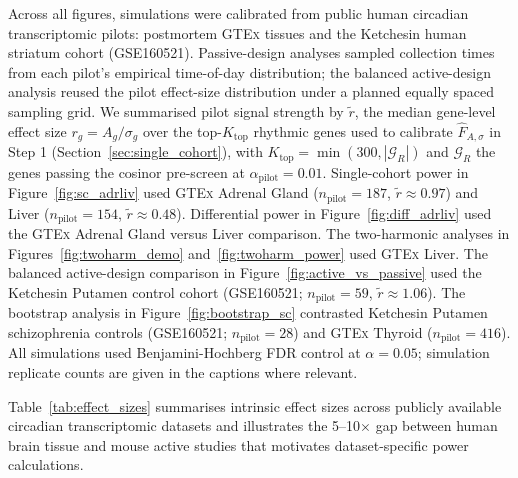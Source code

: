 \documentclass{article}
\begin{document}
Across all figures, simulations were calibrated from public human circadian transcriptomic pilots: postmortem \textsc{GTEx} \citep{gtex2020atlas} tissues and the Ketchesin human striatum cohort \citep{ketchesin2021diurnal} (GSE160521). Passive-design analyses sampled collection times from each pilot's empirical time-of-day distribution; the balanced active-design analysis reused the pilot effect-size distribution under a planned equally spaced sampling grid. We summarised pilot signal strength by $\tilde{r}$, the median gene-level effect size $r_g = A_g/\sigma_g$ over the top-$K_{\mathrm{top}}$ rhythmic genes used to calibrate $\hat{F}_{A,\sigma}$ in Step 1 (Section~\ref{sec:single_cohort}), with $K_{\mathrm{top}} = \min(300, |\mathcal{G}_R|)$ and $\mathcal{G}_R$ the genes passing the cosinor pre-screen at $\alpha_{\mathrm{pilot}} = 0.01$. Single-cohort power in Figure~\ref{fig:sc_adrliv} used \textsc{GTEx} Adrenal Gland ($n_{\text{pilot}} = 187$, $\tilde{r} \approx 0.97$) and Liver ($n_{\text{pilot}} = 154$, $\tilde{r} \approx 0.48$). Differential power in Figure~\ref{fig:diff_adrliv} used the \textsc{GTEx} Adrenal Gland versus Liver comparison. The two-harmonic analyses in Figures~\ref{fig:twoharm_demo} and~\ref{fig:twoharm_power} used \textsc{GTEx} Liver. The balanced active-design comparison in Figure~\ref{fig:active_vs_passive} used the Ketchesin Putamen control cohort (GSE160521; $n_{\text{pilot}} = 59$, $\tilde{r} \approx 1.06$). The bootstrap analysis in Figure~\ref{fig:bootstrap_sc} contrasted Ketchesin Putamen schizophrenia controls (GSE160521; $n_{\text{pilot}} = 28$) and \textsc{GTEx} Thyroid ($n_{\text{pilot}} = 416$). All simulations used Benjamini-Hochberg FDR control at $\alpha = 0.05$; simulation replicate counts are given in the captions where relevant.


Table~\ref{tab:effect_sizes} summarises intrinsic effect sizes across publicly
available circadian transcriptomic datasets and illustrates the 5--10$\times$
gap between human brain tissue and mouse active studies that motivates
dataset-specific power calculations.
\end{document}

